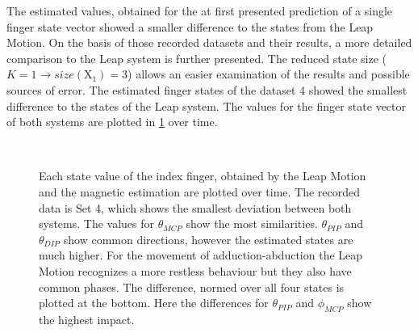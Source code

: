 The estimated values, obtained for the at first presented prediction of a single finger state vector showed a smaller difference to the states from the Leap Motion. On the basis of those recorded datasets and their results, a more detailed comparison to the Leap system is further presented. The reduced state size ($ K = 1 \rightarrow size(\mathrm{X}_{1}) = 3 $) allows an easier examination of the results and possible sources of error. The estimated finger states of the dataset 4 showed the smallest difference to the states of the Leap system. The values for the finger state vector of both systems are plotted in \ref{fig:bestLeap} over time.
\begin{figure}[!htb]
\centering
{}\\
\caption[Comparison of estimated states, which fit best to Leap data]
{Each state value of the index finger, obtained by the Leap Motion and the magnetic estimation are plotted over time. The recorded data is Set 4, which shows the smallest deviation between both systems. The values for $ \theta_{MCP} $ show the most similarities. $ \theta_{PIP} $ and $ \theta_{DIP} $ show common directions, however the estimated states are much higher. For the movement of adduction-abduction the Leap Motion recognizes a more restless behaviour but they also have common phases. The difference, normed over all four states is plotted at the bottom. Here the differences for $ \theta_{PIP} $ and $ \phi_{MCP} $ show the highest impact.}
\label{fig:bestLeap}
\end{figure} 
